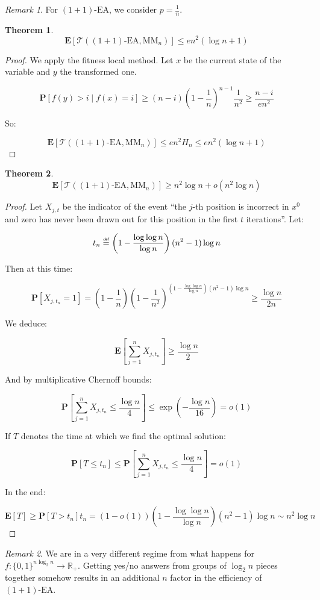 \documentclass[12pt]{article}
\theoremstyle{definition}
\theoremstyle{plain}
\newtheorem*{theorem}{Theorem}
\theoremstyle{remark}
\newtheorem*{remark}{Remark}
\newcommand\mydef{\mathrel{\overset{\makebox[0pt]{\mbox{\normalfont\tiny\sffamily def}}}{=}}}
\begin{document}
\begin{remark}
    For $(1+1)\text{-EA}$, we consider $p=\frac{1}{n}$.
\end{remark}

\begin{theorem}
    $$\mathbf{E}[\mathcal{T}((1+1)\text{-EA},\text{MM}_n)]\le e n^2 (\log n+1)$$
\end{theorem}

\begin{proof}
    We apply the fitness local method. Let $x$ be the current state of the variable and $y$ the transformed one. 

    $$\mathbf{P}[f(y)>i\mid f(x)=i]\ge (n-i)\left(1-\frac{1}{n}\right)^{n-1} \frac{1}{n^2}\ge \frac{n-i}{e n^2}$$

    So:

    $$\mathbf{E}[\mathcal{T}((1+1)\text{-EA},\text{MM}_n)]\le e n^2 H_n\le e n^2(\log n+1)$$\qedhere
\end{proof}

\begin{theorem}
    $$\mathbf{E}[\mathcal{T}((1+1)\text{-EA},\text{MM}_n)]\ge n^2 \log n+o(n^2\log n)$$
\end{theorem}

\begin{proof}
    Let $X_{j,t}$ be the indicator of the event ``the $j$-th position is incorrect in $x^0$ and zero has
    never been drawn out for this position in the first $t$ iterations''. Let:

    $$t_n\mydef \left(1-\frac{\log \log n}{\log n}\right)(n^2-1)\log n$$

    Then at this time:

    $$\mathbf{P}[X_{j,t_n}=1]=
    \left(1-\frac{1}{n}\right)\left(1-\frac{1}{n^2}\right)^{\left(1-\frac{\log\log n}{\log n}\right)(n^2-1)\log n}\ge \frac{\log n}{2n}
    $$

    We deduce:

    $$\mathbf{E}\left[\sum_{j=1}^n X_{j,t_n}\right] \ge \frac{\log n}{2}$$

    And by multiplicative Chernoff bounds:

    $$\mathbf{P}\left[\sum_{j=1}^n X_{j,t_n}\le \frac{\log n}{4}\right] \le \exp\left(-\frac{\log n}{16}\right)=o(1)$$

    If $T$ denotes the time at which we find the optimal solution:

    $$\mathbf{P}[T\le t_n]\le \mathbf{P}\left[\sum_{j=1}^n X_{j,t_n} \le \frac{\log n}{4}\right]=o(1)$$

    In the end:

    $$\mathbf{E}[T]\ge \mathbf{P}[T>t_n] t_n=(1-o(1))\left(1-\frac{\log \log n}{\log n}\right)(n^2-1)\log n\sim n^2\log n$$\qedhere
\end{proof}

\begin{remark}
    We are in a very different regime from what happens for $f:\{0,1\}^{n \log_2 n}\to \mathbb{R}_+$. Getting yes/no
    answers from groups of $\log_2 n$ pieces together somehow results in an additional $n$ factor in the efficiency of $(1+1)\text{-EA}$.
\end{remark}
\end{document}
